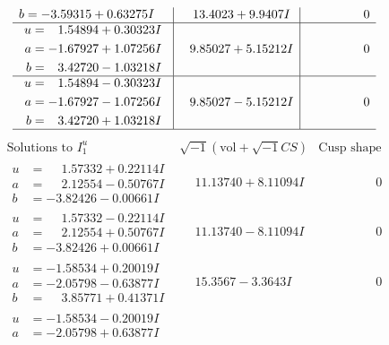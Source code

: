 \documentclass[1p]{elsarticle_modified}
\theoremstyle{definition}
\newcommand{\I}{\sqrt{-1}}
\begin{document}
$$\begin{array}{c|c|c}
\begin{aligned}
b &= -3.59315 + 0.63275 I\end{aligned}
 & \phantom{-}13.4023 + 9.9407 I & \phantom{-0.000000 } 0 \\ \hline\begin{aligned}
u &= \phantom{-}1.54894 + 0.30323 I \\
a &= -1.67927 + 1.07256 I \\
b &= \phantom{-}3.42720 - 1.03218 I\end{aligned}
 & \phantom{-}9.85027 + 5.15212 I & \phantom{-0.000000 } 0 \\ \hline\begin{aligned}
u &= \phantom{-}1.54894 - 0.30323 I \\
a &= -1.67927 - 1.07256 I \\
b &= \phantom{-}3.42720 + 1.03218 I\end{aligned}
 & \phantom{-}9.85027 - 5.15212 I & \phantom{-0.000000 } 0\\
 \hline 
 \end{array}$$\newpage$$\begin{array}{c|c|c}  
\text{Solutions to }I^u_{1}& \I (\text{vol} + \sqrt{-1}CS) & \text{Cusp shape}\\
 \hline 
\begin{aligned}
u &= \phantom{-}1.57332 + 0.22114 I \\
a &= \phantom{-}2.12554 - 0.50767 I \\
b &= -3.82426 - 0.00661 I\end{aligned}
 & \phantom{-}11.13740 + 8.11094 I & \phantom{-0.000000 } 0 \\ \hline\begin{aligned}
u &= \phantom{-}1.57332 - 0.22114 I \\
a &= \phantom{-}2.12554 + 0.50767 I \\
b &= -3.82426 + 0.00661 I\end{aligned}
 & \phantom{-}11.13740 - 8.11094 I & \phantom{-0.000000 } 0 \\ \hline\begin{aligned}
u &= -1.58534 + 0.20019 I \\
a &= -2.05798 - 0.63877 I \\
b &= \phantom{-}3.85771 + 0.41371 I\end{aligned}
 & \phantom{-}15.3567 - 3.3643 I & \phantom{-0.000000 } 0 \\ \hline\begin{aligned}
u &= -1.58534 - 0.20019 I \\
a &= -2.05798 + 0.63877 I \\

\end{aligned}
\end{array}$$
\end{document}
